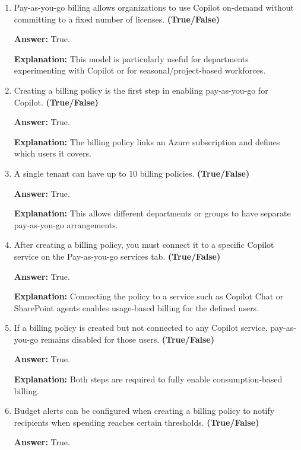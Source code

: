 \documentclass[10pt]{article}
\begin{document}
\begin{enumerate}[leftmargin=*]
\textbf{Answer:} True.

\textbf{Explanation:} Any new member added to the group automatically inherits the Copilot license.

\item Pay-as-you-go billing allows organizations to use Copilot on-demand without committing to a fixed number of licenses. \textbf{(True/False)}

\textbf{Answer:} True.

\textbf{Explanation:} This model is particularly useful for departments experimenting with Copilot or for seasonal/project-based workforces.

\item Creating a billing policy is the first step in enabling pay-as-you-go for Copilot. \textbf{(True/False)}

\textbf{Answer:} True.

\textbf{Explanation:} The billing policy links an Azure subscription and defines which users it covers.

\item A single tenant can have up to 10 billing policies. \textbf{(True/False)}

\textbf{Answer:} True.

\textbf{Explanation:} This allows different departments or groups to have separate pay-as-you-go arrangements.

\item After creating a billing policy, you must connect it to a specific Copilot service on the Pay-as-you-go services tab. \textbf{(True/False)}

\textbf{Answer:} True.

\textbf{Explanation:} Connecting the policy to a service such as Copilot Chat or SharePoint agents enables usage-based billing for the defined users.

\item If a billing policy is created but not connected to any Copilot service, pay-as-you-go remains disabled for those users. \textbf{(True/False)}

\textbf{Answer:} True.

\textbf{Explanation:} Both steps are required to fully enable consumption-based billing.

\item Budget alerts can be configured when creating a billing policy to notify recipients when spending reaches certain thresholds. \textbf{(True/False)}

\textbf{Answer:} True.


\end{enumerate}
\end{document}
